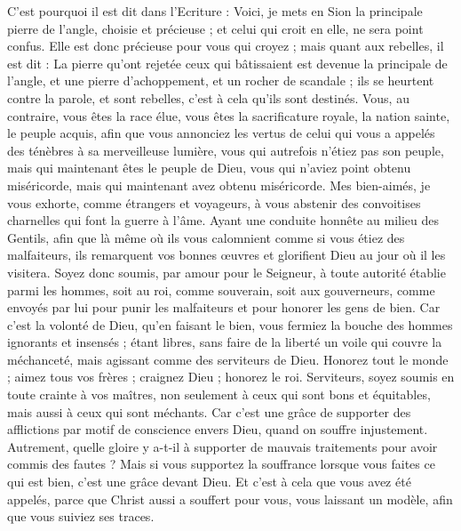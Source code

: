 \begin{multicols}{2}
C'est pourquoi il est dit dans l'Ecriture : Voici, je mets en Sion la principale pierre de l’angle, choisie et précieuse ; et celui qui croit en elle, ne sera point confus.
Elle est donc précieuse pour vous qui croyez ; mais quant aux rebelles, il est dit : La pierre qu’ont rejetée ceux qui bâtissaient est devenue la principale de l’angle, 
et une pierre d'achoppement, et un rocher de scandale ; ils se heurtent contre la parole, et sont rebelles, c’est à cela qu’ils sont destinés.
Vous, au contraire, vous êtes la race élue, vous êtes la sacrificature royale, la nation sainte, le peuple acquis, afin que vous annonciez les vertus de celui qui vous a appelés des ténèbres à sa merveilleuse lumière,
vous qui autrefois n'étiez pas son peuple, mais qui maintenant êtes le peuple de Dieu, vous qui n'aviez point obtenu miséricorde, mais qui maintenant avez obtenu miséricorde.
Mes bien-aimés, je vous exhorte, comme étrangers et voyageurs, à vous abstenir des convoitises charnelles qui font la guerre à l'âme.
Ayant une conduite honnête au milieu des Gentils, afin que là même où ils vous calomnient comme si vous étiez des malfaiteurs, ils remarquent vos bonnes œuvres et glorifient Dieu au jour où il les visitera.
Soyez donc soumis, par amour pour le Seigneur, à toute autorité établie parmi les hommes, soit au roi, comme souverain,
soit aux gouverneurs, comme envoyés par lui pour punir les malfaiteurs et pour honorer les gens de bien.
Car c'est la volonté de Dieu, qu'en faisant le bien, vous fermiez la bouche des hommes ignorants et insensés ;
étant libres, sans faire de la liberté un voile qui couvre la méchanceté, mais agissant comme des serviteurs de Dieu.
Honorez tout le monde ; aimez tous vos frères ; craignez Dieu ; honorez le roi.
Serviteurs, soyez soumis en toute crainte à vos maîtres, non seulement à ceux qui sont bons et équitables, mais aussi à ceux qui sont méchants.
Car c’est une grâce de supporter des afflictions par motif de conscience envers Dieu, quand on souffre injustement.
Autrement, quelle gloire y a-t-il à supporter de mauvais traitements pour avoir commis des fautes ? Mais si vous supportez la souffrance lorsque vous faites ce qui est bien, c’est une grâce devant Dieu.
Et c’est à cela que vous avez été appelés, parce que Christ aussi a souffert pour vous, vous laissant un modèle, afin que vous suiviez ses traces.

\end{multicols}
